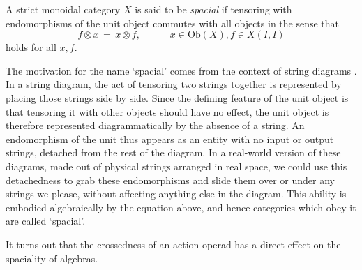 \documentclass{amsbook} %
\numberwithin{section}{chapter}
\begin{document}
\begin{Defi} A strict monoidal category $X$ is said to be \emph{spacial} if tensoring with endomorphisms of the unit object commutes with all objects in the sense that 
\[ f \otimes x \, = \, x \otimes f, \quad \quad \quad x \in \mathrm{Ob}(X), f \in X(I,I) \]
holds for all $x, f$.
\end{Defi}

The motivation for the name `spacial' comes from the context of string diagrams \cite{sel-graphmon}. In a string diagram, the act of tensoring two strings together is represented by placing those strings side by side. Since the defining feature of the unit object is that tensoring it with other objects should have no effect, the unit object is therefore represented diagrammatically by the absence of a string. An endomorphism of the unit thus appears as an entity with no input or output strings, detached from the rest of the diagram. In a real-world version of these diagrams, made out of physical strings arranged in real space, we could use this detachedness to grab these endomorphisms and slide them over or under any strings we please, without affecting anything else in the diagram. This ability is embodied algebraically by the equation above, and hence categories which obey it are called `spacial'.

It turns out that the crossedness of an action operad has a direct effect on the spaciality of algebras.
\end{document}
